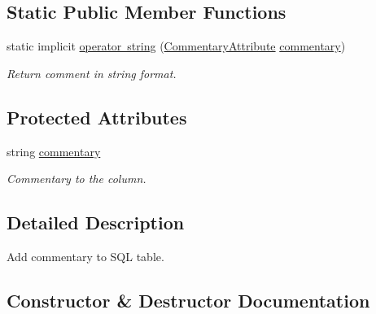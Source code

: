 \subsection*{Static Public Member Functions}
\begin{DoxyCompactItemize}
\item 
static implicit \mbox{\hyperlink{class_uniform_data_operator_1_1_sql_1_1_markup_1_1_commentary_attribute_a7bf4b9cbf59270e66700f7c2468ccb00}{operator string}} (\mbox{\hyperlink{class_uniform_data_operator_1_1_sql_1_1_markup_1_1_commentary_attribute}{Commentary\+Attribute}} \mbox{\hyperlink{class_uniform_data_operator_1_1_sql_1_1_markup_1_1_commentary_attribute_a729a7d6773b3df9dd31090b1cf8e35b1}{commentary}})
\begin{DoxyCompactList}\small\item\em Return comment in string format. \end{DoxyCompactList}\end{DoxyCompactItemize}
\subsection*{Protected Attributes}
\begin{DoxyCompactItemize}
\item 
string \mbox{\hyperlink{class_uniform_data_operator_1_1_sql_1_1_markup_1_1_commentary_attribute_a729a7d6773b3df9dd31090b1cf8e35b1}{commentary}}
\begin{DoxyCompactList}\small\item\em Commentary to the column. \end{DoxyCompactList}\end{DoxyCompactItemize}


\subsection{Detailed Description}
Add commentary to S\+QL table. 



\subsection{Constructor \& Destructor Documentation}
\mbox{\label{class_uniform_data_operator_1_1_sql_1_1_markup_1_1_commentary_attribute_a89e4ce7ba19efd0b533ef9a5d013658d}} 
